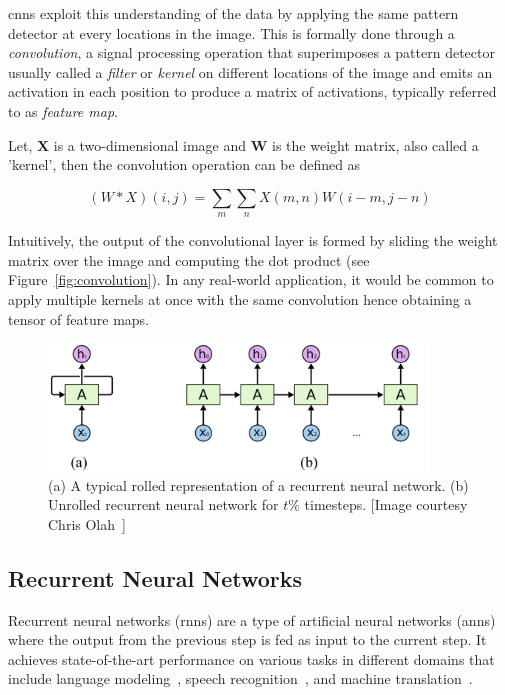 \gls{cnn}s exploit this understanding of the data by applying the same pattern detector at every locations in the image. This is formally done through a \textit{convolution}, a signal processing operation that superimposes a pattern detector usually called a \textit{filter} or \textit{kernel} on different locations of the image and emits an activation in each position to produce a matrix of activations, typically referred to as \textit{feature map}. 

Let, $\mathbf{X}$ is a two-dimensional image and $\mathbf{W}$ is the weight matrix, also called a ’kernel’, then the convolution operation can be defined as 

\begin{equation}
(W \ast X)(i, j) = \sum_{m}\sum_{n} X(m, n) W (i - m, j - n)
\end{equation}

Intuitively, the output of the convolutional layer is formed by sliding the weight matrix over the image and computing the dot product (see Figure~\ref{fig:convolution}). In any real-world application, it would be common to apply multiple kernels at once with the same convolution hence obtaining a tensor of feature maps.




\begin{figure}
	\centering
	\includegraphics[width=0.9\textwidth]{figures/RNN_unrolled.pdf}
	\caption[A typical rolled representation of a recurrent neural network]
	{(a) A typical rolled representation of a recurrent neural network. (b) Unrolled recurrent neural network for $t$\% timesteps. [Image courtesy Chris Olah~\cite{colah_15}]\label{fig:RNN_unrolled}}
\end{figure}

\subsection{Recurrent Neural Networks} 
Recurrent neural networks (\gls{rnn}s) are a type of artificial neural networks (\gls{ann}s) where the output from the previous step is fed as input to the current step. It achieves state-of-the-art performance on various tasks in different domains that include language modeling~\cite{mikolov_12}, speech recognition~\cite{graves_13}, and machine translation~\cite{kal_13}.  

